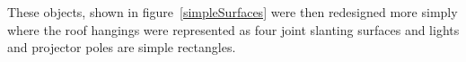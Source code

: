 \documentclass[../../main.tex]{subfiles}
\begin{document}

			These objects, shown in figure~\ref{simpleSurfaces} were then redesigned more simply where the roof hangings were represented as four joint slanting surfaces and lights and projector poles are simple rectangles.

\end{document}
